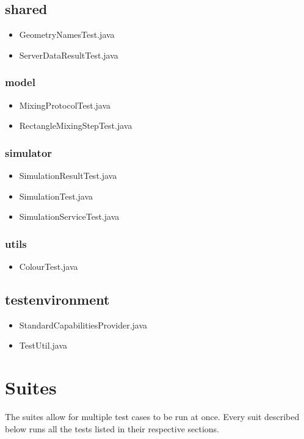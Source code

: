 \subsection{shared}
\begin{itemize}
\item GeometryNamesTest.java
\item ServerDataResultTest.java
\end{itemize}
\subsubsection{model}
\begin{itemize}
\item MixingProtocolTest.java
\item RectangleMixingStepTest.java
\end{itemize}
\subsubsection{simulator}
\begin{itemize}
\item SimulationResultTest.java
\item SimulationTest.java
\item SimulationServiceTest.java
\end{itemize}
\subsubsection{utils}
\begin{itemize}
\item ColourTest.java
\end{itemize}

\subsection{testenvironment}
\begin{itemize}
\item StandardCapabilitiesProvider.java
\item TestUtil.java
\end{itemize} 

\section{Suites}
The suites allow for multiple test cases to be run at once. Every suit described below runs all the tests listed in their respective sections.


